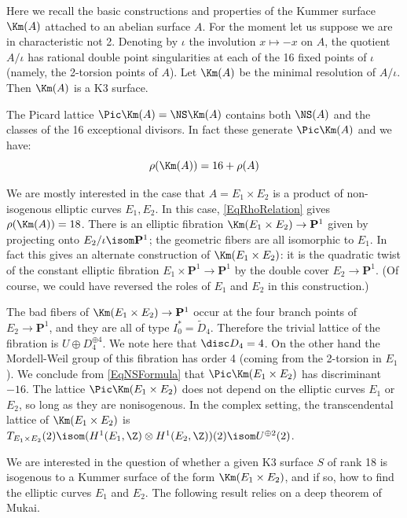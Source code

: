 \documentclass{article}
\begin{document}
Here we recall the basic constructions and properties of the Kummer surface $\Km(A)$ attached to an abelian surface $A$.   For the moment let us suppose we are in characteristic not 2.   Denoting by $\iota$ the involution $x\mapsto -x$ on $A$, the quotient $A/\iota$ has rational double point singularities at each of the 16 fixed points of $\iota$ (namely, the 2-torsion points of $A$).  Let $\Km(A)$ be the minimal resolution of $A/\iota$.  Then $\Km(A)$ is a K3 surface. 

The Picard lattice $\Pic \Km(A)=\NS \Km(A)$ contains both $\NS(A)$ and the classes of the 16 exceptional divisors.  In fact these generate $\Pic \Km(A)$ and we have:
\begin{equation}
\label{EqRhoRelation}
 \rho(\Km(A)) = 16+\rho(A) 
 \end{equation}

We are mostly interested in the case that $A=E_1\times E_2$ is a product of non-isogenous elliptic curves $E_1,E_2$.  In this case, \eqref{EqRhoRelation} gives $\rho(\Km(A))=18$.   There is an elliptic fibration $\Km(E_1\times E_2)\to \mathbf{P}^1$ given by projecting onto $E_2/\iota\isom \mathbf{P}^1$;  the geometric fibers are all isomorphic to $E_1$.  In fact this gives an alternate construction of $\Km(E_1\times E_2)$:  it is the quadratic twist of the constant elliptic fibration $E_1\times \mathbf{P}^1\to \mathbf{P}^1$ by the double cover $E_2\to \mathbf{P}^1$.  (Of course, we could have reversed the roles of $E_1$ and $E_2$ in this construction.)

The bad fibers of $\Km(E_1\times E_2)\to \mathbf{P}^1$ occur at the four branch points of $E_2\to \mathbf{P}^1$, and they are all of type $I_0^\ast = \tilde D_4$.  Therefore the trivial lattice of the fibration is $U\oplus D_4^{\oplus 4}$.  We note here that $\disc D_4=4$.  On the other hand the Mordell-Weil group of this fibration has order 4 (coming from the 2-torsion in $E_1$).  We conclude from \eqref{EqNSFormula} that $\Pic \Km(E_1\times E_2)$ has discriminant $-16$. The lattice $\Pic\Km(E_1\times E_2)$ does not depend on the elliptic curves $E_1$ or $E_2$, so long as they are nonisogenous.   In the complex setting, the transcendental lattice of $\Km(E_1\times E_2)$ is $T_{E_1\times E_2}(2)\isom (H^1(E_1,\Z)\otimes H^1(E_2,\Z))(2)\isom U^{\oplus 2}(2)$.

We are interested in the question of whether a given K3 surface $S$ of rank 18 is isogenous to a Kummer surface of the form $\Km(E_1\times E_2)$, and if so, how to find the elliptic curves $E_1$ and $E_2$.    The following result relies on a deep theorem of Mukai.
\end{document}
